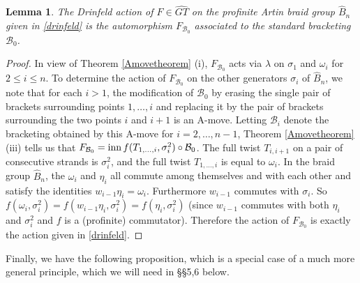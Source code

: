 \documentclass[a4paper,10pt,reqno]{amsart}
\newcommand\GT{\widehat{GT}}
\newcommand\B{\widehat{B}}
\newtheorem{lem}[thm]{Lemma}
\begin{document}
\begin{lem} The Drinfeld action of $F\in \GT$ on the profinite Artin braid group $\B_n$ given in 
\eqref{drinfeld} is the automorphism $F_{\mathcal{B}_0}$ associated to the standard
bracketing ${\mathcal{B}_0}$. 
\end{lem}

\begin{proof}
In view of Theorem \ref{Amovetheorem} (i), 
$F_{\mathcal{B}_0}$ acts via $\lambda$ on $\sigma_1$ and $\omega_i$ for 
$2\le i \le n$. To determine the action of $F_{\mathcal{B}_0}$ on the other 
generators $\sigma_i$ of $\B_n$, we note that for each $i>1$, the modification 
of ${\mathcal{B}_0}$ by erasing the single pair of brackets surrounding points 
$1,\ldots,i$ and replacing it by the pair of brackets surrounding the two points
$i$ and $i+1$ is an A-move. Letting ${\mathcal{B}_i}$ denote the 
bracketing obtained by this A-move for $i=2,\ldots,n-1$,
Theorem \ref{Amovetheorem} (iii) tells us that $F_{\mathcal{B}_0}
={\rm inn}\,f(T_{1,\ldots,i},\sigma_i^2)\circ {\mathcal{B}_0}$. The full 
twist $T_{i,i+1}$ on a pair of consecutive strands is $\sigma_i^2$,
and the full twist $T_{1,\ldots,i}$ is equal to $\omega_i$. In the braid group 
$\B_n$, the $\omega_i$ and $\eta_i$ all commute among themselves and with each other and
satisfy the identities $w_{i-1}\eta_i=\omega_i$. Furthermore $w_{i-1}$ commutes
with $\sigma_i$. So $f(\omega_i,\sigma_i^2)=f(w_{i-1}\eta_i,\sigma_i^2)=
f(\eta_i,\sigma_i^2)$ (since $w_{i-1}$ commutes with both $\eta_i$ and $\sigma_i^2$
and $f$ is a (profinite) commutator). Therefore the action of
$F_{\mathcal{B}_0}$ is exactly the action given in \eqref{drinfeld}.
\end{proof}

Finally, we have the following proposition, which is a special case 
of a much more general principle, which we will need in \S\S 5,6 below.
\end{document}
